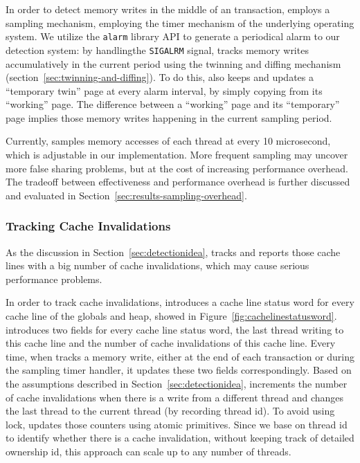 In order to detect memory writes in the middle of an transaction, \SheriffDetect{} employs a sampling mechanism, employing the timer mechanism of the underlying operating system. 
We utilize the \texttt{alarm} library API to generate a periodical alarm to our detection system: by handlingthe \texttt{SIGALRM} signal, \SheriffDetect{} tracks memory writes accumulatively in the current period using the twinning and diffing mechanism (section~\ref{sec:twinning-and-diffing}). To do this, \SheriffDetect{} also keeps and updates a ``temporary twin'' page at every alarm interval, by simply copying from its ``working'' page. The difference between a ``working'' page and its ``temporary'' page implies those memory writes happening in the current sampling period. 

Currently, \SheriffDetect{} samples memory accesses of each thread at every 10 microsecond, which is  adjustable in our implementation. More frequent sampling may uncover more false sharing problems, but at the cost of increasing performance overhead. The tradeoff between effectiveness and performance overhead is further discussed and evaluated in Section~\ref{sec:results-sampling-overhead}. 

\subsubsection{Tracking Cache Invalidations}
\label{sec:invalidation}
As the discussion in Section~\ref{sec:detectionidea}, \SheriffDetect{} tracks and reports those cache lines with a big number of cache invalidations, which may cause serious performance problems. 

In order to track cache invalidations, \SheriffDetect{} introduces a cache line status word for every cache line of the globals and heap, showed in Figure~\ref{fig:cachelinestatusword}.  \SheriffDetect{} introduces two fields for every cache line status word, the last thread writing to this cache line and the number of cache invalidations of this cache line. 
Every time, when \SheriffDetect{} tracks a memory write, either at the end of each transaction or during the sampling timer handler, it updates these two fields correspondingly. Based on the assumptions described in Section~\ref{sec:detectionidea}, \SheriffDetect{} increments the number of cache invalidations when there is a write from a different thread and changes the last thread to the current thread (by recording thread id). To avoid using lock, \SheriffDetect{} updates those counters using atomic primitives. Since we base on thread id to identify whether there is a cache invalidation, without keeping track of detailed ownership id, this approach can scale up to any number of threads.   

